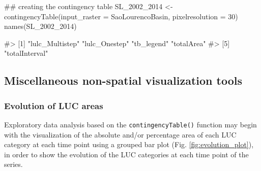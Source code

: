 \begin{Schunk}
\begin{Sinput}
## creating the contingency table
SL_2002_2014 <- contingencyTable(input_raster = SaoLourencoBasin,
                                 pixelresolution = 30)
names(SL_2002_2014)
\end{Sinput}
\begin{Soutput}
#> [1] "lulc_Multistep" "lulc_Onestep"   "tb_legend"      "totalArea"     
#> [5] "totalInterval"
\end{Soutput}
\end{Schunk}

\FloatBarrier

\hypertarget{miscellaneous-non-spatial-visualization-tools}{%
\subsection{Miscellaneous non-spatial visualization
tools}\label{miscellaneous-non-spatial-visualization-tools}}

\hypertarget{evolution-of-luc-areas}{%
\subsubsection{Evolution of LUC areas}\label{evolution-of-luc-areas}}

Exploratory data analysis based on the \texttt{contingencyTable()}
function may begin with the visualization of the absolute and/or
percentage area of each LUC category at each time point using a grouped
bar plot (Fig. \ref{fig:evolution_plot}), in order to show the evolution
of the LUC categories at each time point of the series.

